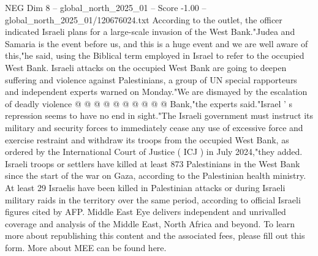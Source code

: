 \begin{textsample}{NEG Dim 8 – global\_north\_2025\_01 – Score -1.00 – global\_north\_2025\_01/120676024.txt}
According to the outlet, the officer indicated Israeli plans for a large-scale invasion of the West Bank."Judea and Samaria is the event before us, and this is a huge event and we are well aware of this,"he said, using the Biblical term employed in Israel to refer to the occupied West Bank.
Israeli attacks on the occupied West Bank are going to deepen suffering and violence against Palestinians, a group of UN special rapporteurs and independent experts warned on Monday."We are dismayed by the escalation of deadly violence @ @ @ @ @ @ @ @ @ @ Bank,"the experts said."Israel ' s repression seems to have no end in sight."The Israeli government must instruct its military and security forces to immediately cease any use of excessive force and exercise restraint and withdraw its troops from the occupied West Bank, as ordered by the International Court of Justice ( ICJ ) in July 2024,"they added.
Israeli troops or settlers have killed at least 873 Palestinians in the West Bank since the start of the war on Gaza, according to the Palestinian health ministry.
At least 29 Israelis have been killed in Palestinian attacks or during Israeli military raids in the territory over the same period, according to official Israeli figures cited by AFP.
Middle East Eye delivers independent and unrivalled coverage and analysis of the Middle East, North Africa and beyond.
To learn more about republishing this content and the associated fees, please fill out this form.
More about MEE can be found here.

\end{textsample}

